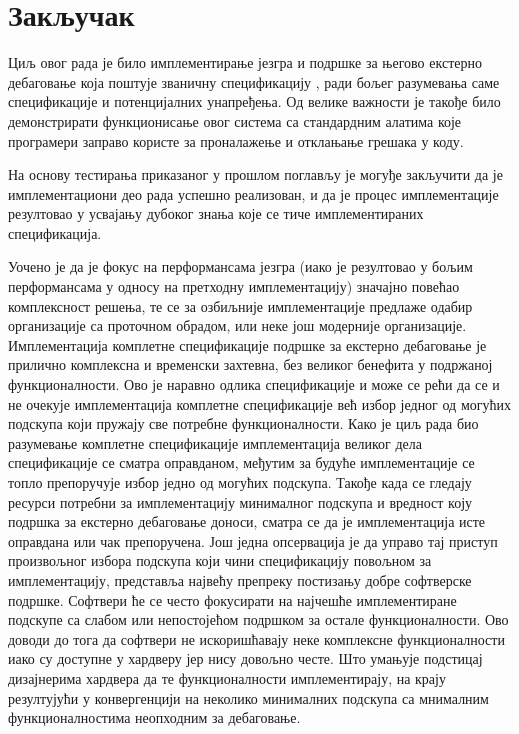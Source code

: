 \chapter{Закључак}

Циљ овог рада је било имплементирање  језгра и подршке за његово екстерно дебаговање која поштује званичну спецификацију \cite{debug_spec}, ради бољег разумевања саме спецификације и потенцијалних унапређења. Од велике важности је такође било демонстрирати функционисање овог система са стандардним алатима које програмери заправо користе за проналажење и отклањање грешака у коду.

На основу тестирања приказаног у прошлом поглављу је могуђе закључити да је имплементациони део рада успешно реализован, и да је процес имплементације резултовао у усвајању дубоког знања које се тиче имплементираних спецификација.

Уочено је да је фокус на перформансама језгра (иако је резултовао у бољим перформансама у односу на претходну имплементацију) значајно повећао комплексност решења, те се за озбиљније имплементације предлаже одабир организације са проточном обрадом, или неке још модерније организације.
Имплементација комплетне спецификације подршке за екстерно дебаговање је прилично комплексна и временски захтевна, без великог бенефита у подржаној функционалности. Ово је наравно одлика спецификације и може се рећи да се и не очекује имплементација комплетне спецификације већ избор једног од могућих подскупа који пружају све потребне функционалности. Како је циљ рада био разумевање комплетне спецификације имплементација великог дела спецификације се сматра оправданом, међутим за будуће имплементације се топло препоручује избор једно од могућих подскупа. Такође када се гледају ресурси потребни за имплементацију минималног подскупа и вредност коју подршка за екстерно дебаговање доноси, сматра се да је имплементација исте оправдана или чак препоручена. Још једна опсервација је да управо тај приступ произвољног избора подскупа који чини спецификацију повољном за имплементацију, представља највећу препреку постизању добре софтверске подршке. Софтвери ће се често фокусирати на најчешће имплементиране подскупе са слабом или непостојећом подршком за остале функционалности. Ово доводи до тога да софтвери не искоришћавају неке комплексне функционалности иако су доступне у хардверу јер нису довољно честе. Што умањује подстицај дизајнерима хардвера да те функционалности имплементирају, на крају резултујући у конвергенцији на неколико минималних подскупа са мнималним функционалностима неопходним за дебаговање.

